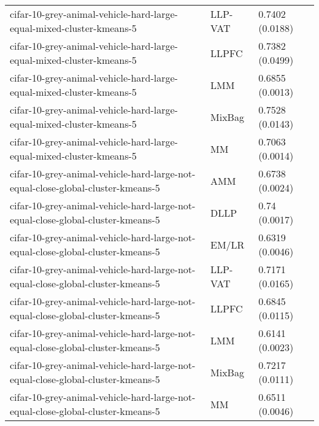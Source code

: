 \begin{longtable}{lll}
                                         cifar-10-grey-animal-vehicle-hard-large-equal-mixed-cluster-kmeans-5 &   LLP-VAT &                           0.7402 (0.0188) \\
                                         cifar-10-grey-animal-vehicle-hard-large-equal-mixed-cluster-kmeans-5 &     LLPFC &                           0.7382 (0.0499) \\
                                         cifar-10-grey-animal-vehicle-hard-large-equal-mixed-cluster-kmeans-5 &       LMM &                           0.6855 (0.0013) \\
                                         cifar-10-grey-animal-vehicle-hard-large-equal-mixed-cluster-kmeans-5 &    MixBag &                           0.7528 (0.0143) \\
                                         cifar-10-grey-animal-vehicle-hard-large-equal-mixed-cluster-kmeans-5 &        MM &                           0.7063 (0.0014) \\
                              cifar-10-grey-animal-vehicle-hard-large-not-equal-close-global-cluster-kmeans-5 &       AMM &                           0.6738 (0.0024) \\
                              cifar-10-grey-animal-vehicle-hard-large-not-equal-close-global-cluster-kmeans-5 &      DLLP &                             0.74 (0.0017) \\
                              cifar-10-grey-animal-vehicle-hard-large-not-equal-close-global-cluster-kmeans-5 &     EM/LR &                           0.6319 (0.0046) \\
                              cifar-10-grey-animal-vehicle-hard-large-not-equal-close-global-cluster-kmeans-5 &   LLP-VAT &                           0.7171 (0.0165) \\
                              cifar-10-grey-animal-vehicle-hard-large-not-equal-close-global-cluster-kmeans-5 &     LLPFC &                           0.6845 (0.0115) \\
                              cifar-10-grey-animal-vehicle-hard-large-not-equal-close-global-cluster-kmeans-5 &       LMM &                           0.6141 (0.0023) \\
                              cifar-10-grey-animal-vehicle-hard-large-not-equal-close-global-cluster-kmeans-5 &    MixBag &                           0.7217 (0.0111) \\
                              cifar-10-grey-animal-vehicle-hard-large-not-equal-close-global-cluster-kmeans-5 &        MM &                           0.6511 (0.0046) \\

\end{longtable}
